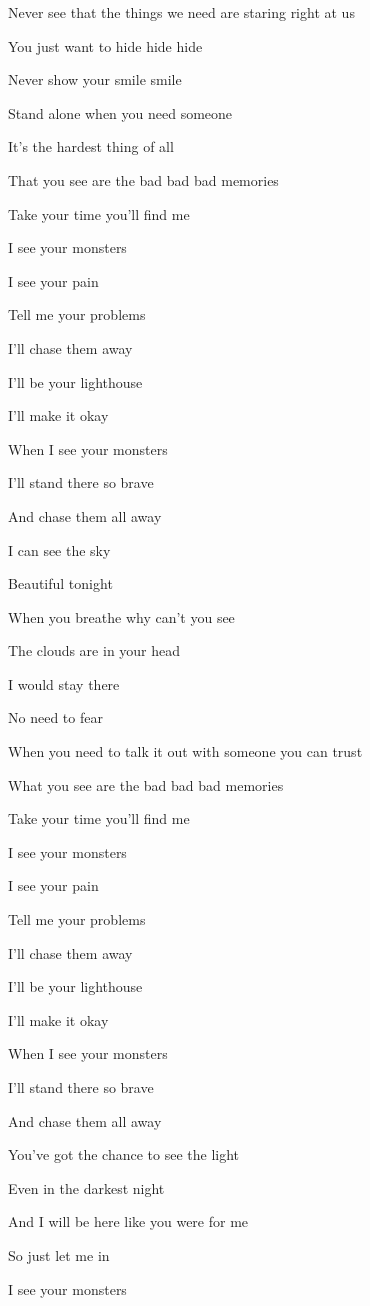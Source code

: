 \documentclass[]{ctexbook}
\begin{document}
Never see that the things we need are staring right at us

You just want to hide hide hide

Never show your smile smile

Stand alone when you need someone

It's the hardest thing of all

That you see are the bad bad bad memories

Take your time you'll find me

I see your monsters

I see your pain

Tell me your problems

I'll chase them away

I'll be your lighthouse

I'll make it okay

When I see your monsters

I'll stand there so brave

And chase them all away

I can see the sky

Beautiful tonight

When you breathe why can't you see

The clouds are in your head

I would stay there

No need to fear

When you need to talk it out with someone you can trust

What you see are the bad bad bad memories

Take your time you'll find me

I see your monsters

I see your pain

Tell me your problems

I'll chase them away

I'll be your lighthouse

I'll make it okay

When I see your monsters

I'll stand there so brave

And chase them all away

You've got the chance to see the light

Even in the darkest night

And I will be here like you were for me

So just let me in

I see your monsters
\end{document}
